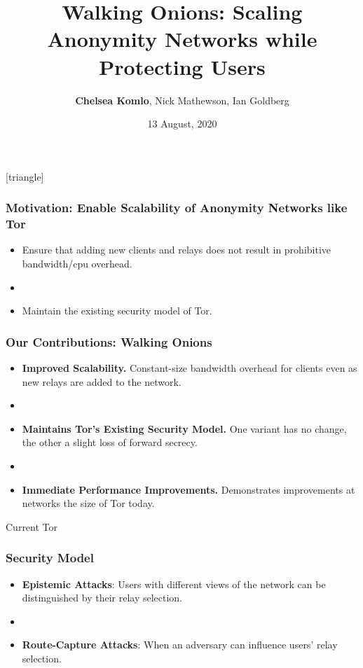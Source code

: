 \documentclass[hyperref={pdfpagelabels=true},table,dvipsnames,14pt,aspectratio=169]{beamer}
\title[Walking Onions]{Walking Onions: Scaling Anonymity Networks while Protecting Users}
\author{\textbf{Chelsea Komlo}, Nick Mathewson, Ian Goldberg}
\institute{\small{Presented at USENIX Security}}
\date{13 August, 2020}
\begin{document}
[triangle]

\begin{frame}
        \thispagestyle{empty}
        \maketitle
\end{frame}


\begin{frame}
\frametitle{Motivation: Enable Scalability of Anonymity Networks like Tor}
  \begin{itemize}
    \item Ensure that adding new clients and relays
      does not result in prohibitive bandwidth/cpu overhead.
    \item[]~
    \item Maintain the existing security model of Tor.
  \end{itemize}
\end{frame}

\begin{frame}
\frametitle{Our Contributions: Walking Onions}
  \begin{itemize}
    \item \textbf{Improved Scalability.} Constant-size bandwidth overhead for
      clients even as new relays are added to the network.
    \item[]~
    \item \textbf{Maintains Tor's Existing Security Model.} One variant has no change,
      the other a slight loss of forward secrecy.
    \item[]~
    \item \textbf{Immediate Performance Improvements.} Demonstrates
      improvements at networks the size of Tor today.
  \end{itemize}
\end{frame}

\begin{frame}
  \centering
  \huge
  Current Tor
\end{frame}

\begin{frame}
\frametitle{Security Model}

  \begin{itemize}
    \item \textbf{Epistemic Attacks}: Users with different views of the
      network can be distinguished by their relay selection.
    \item[]~
    \item \textbf{Route-Capture Attacks}: When an adversary can influence
      users' relay selection.
  \end{itemize}

\end{frame}
\end{document}
